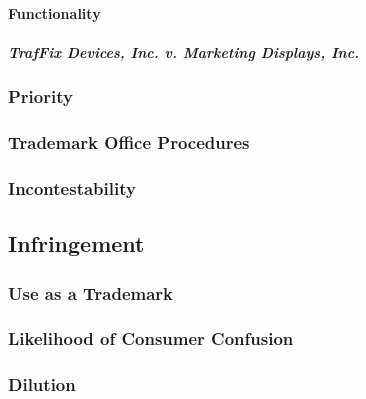 
\paragraph{Functionality}


\paragraph{\emph{TrafFix Devices, Inc. v. Marketing Displays, Inc.}}


\subsubsection{Priority}


\subsubsection{Trademark Office Procedures}


\subsubsection{Incontestability}


\subsection{Infringement}

\subsubsection{Use as a Trademark}


\subsubsection{Likelihood of Consumer Confusion}


\subsubsection{Dilution}


